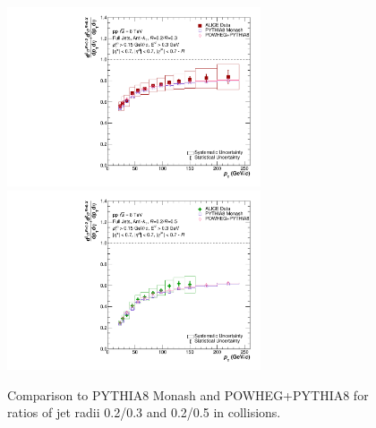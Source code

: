 \begin{figure}
    \centering
    \begin{multicols}{2}
            \includegraphics[width=7.5cm]{figures/MCGen/MCComp_Ratio_R0302_nooutlier.pdf}
        \vfill\null
        \columnbreak
            \includegraphics[width=7.5cm]{figures/MCGen/MCComp_Ratio_R0502_nooutlier.pdf}
        \vfill\null
    \end{multicols}
    \caption{Comparison to PYTHIA8 Monash and POWHEG+PYTHIA8 for ratios of jet radii 0.2/0.3 and 0.2/0.5 in \pp collisions.}
    \label{fig:MCGen_Ratio}
\end{figure}

